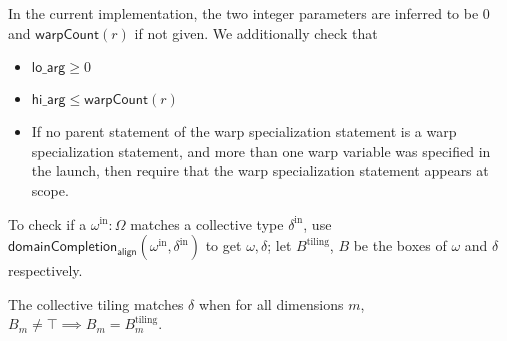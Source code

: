 \filbreak
In the current implementation, the two integer parameters are inferred to be $0$ and $\mathsf{warpCount}(r)$ if not given.
We additionally check that
\begin{itemize}
  \item $\mathsf{lo\_arg} \ge 0$
  \filbreak
  \item $\mathsf{hi\_arg} \le \mathsf{warpCount}(r)$
  \filbreak
  \item If no parent statement of the warp specialization statement is a warp specialization statement, and more than one warp variable was specified in the  launch, then require that the warp specialization statement appears at  scope.
\end{itemize}

\filbreak
{}

To check if a $\omega^\text{in}: \Omega$ matches a collective type $\delta^\text{in}$, use $\mathsf{domainCompletion_{align}}(\omega^\text{in}, \delta^\text{in})$ to get $\omega, \delta$; let $B^\text{tiling}$, $B$ be the boxes of $\omega$ and $\delta$ respectively.

The collective tiling matches $\delta$ when for all dimensions $m$, $B_m \ne \top \implies B_m = B_m^\text{tiling}$.


